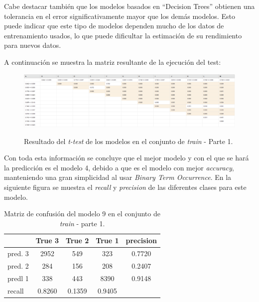 \documentclass[es]{uc3mreport}
\begin{document}
\begin{report}
    Cabe destacar también que los modelos basados en ``Decision Trees'' obtienen
    una tolerancia en el error significativamente mayor que los demás modelos.
    Esto puede indicar que este tipo de modelos dependen mucho de los datos de
    entrenamiento usados, lo que puede dificultar la estimación de su rendimiento
    para nuevos datos.

    A continuación se muestra la matriz resultante de la ejecución del test:

    \begin{figure}[H]
        \center
        \includegraphics[width=\linewidth]{t_test1.jpeg}\\
        \caption{Resultado del \textit{t-test} de los modelos en el conjunto de
        \textit{train} - Parte 1.}
    \end{figure}

    Con toda esta información se concluye que el mejor modelo y con el que se hará
    la predicción es el modelo 4, debido a que es el modelo con mejor
    \textit{accuracy}, manteniendo una gran simplicidad al usar \textit{Binary Term
    Occurrence}. En la siguiente figura se muestra el \textit{recall} y
    \textit{precision} de las diferentes clases para este modelo.

\begin{table}[H]
\center
\begin{tabular}{@{}lccc|c@{}}
    \toprule
             & True 3 & True 2 & True 1 & precision\\
    \hline
    pred. 3  & 2952   & 549    & 323    & 0.7720   \\
    pred. 2  & 284    & 156    & 208    & 0.2407   \\
    predl 1  & 338    & 443    & 8390   & 0.9148   \\
    \hline
    recall   & 0.8260 & 0.1359 & 0.9405 &          \\
    \bottomrule
\end{tabular}
\caption{Matriz de confusión del modelo 9 en el conjunto de \textit{train} -
parte 1.}
\end{table}


\end{report}
\end{document}
